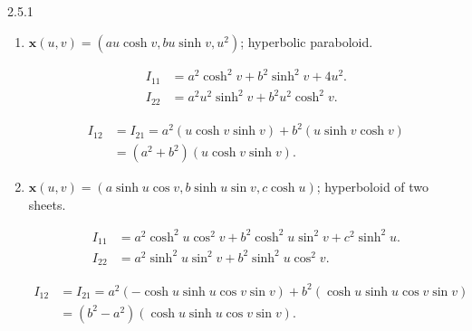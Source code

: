 \documentclass[11pt]{article}
\begin{document}
\begin{problem}{2.5.1}
\begin{enumerate}[label=(\alph*)]
\begin{answer}
			      \begin{equation}
				      \label{eq:11}
				      \begin{aligned}
					      I_{12} & = I_{21} = a^2(-u\cos v\sin v) + b^2(u\sin v \cos v) \\
					             & = (b^2 - a^2)(u \cos v \sin v).
				      \end{aligned}
			      \end{equation}
		      \end{answer}
		\item \( \mathbf{x}(u,v) = (au \cosh v, bu \sinh v, u^2) \); hyperbolic paraboloid.
		      \begin{answer}
			      \begin{equation}
				      \label{eq:12}
				      \begin{aligned}
					      I_{11} & = a^2 \cosh^2 v + b^2 \sinh^2 v + 4 u^2. \\
					      I_{22} & = a^2 u^2\sinh^2 v + b^2 u^2 \cosh^2 v.
				      \end{aligned}
			      \end{equation}

            \begin{equation}
            \label{eq:13}
            \begin{aligned}
              I_{12} &= I_{21} = a^2(u \cosh v \sinh v) + b^2(u \sinh v \cosh v) \\
              &= (a^2 + b^2)(u \cosh v \sinh v).
            \end{aligned}
            \end{equation}
		      \end{answer}
		\item \( \mathbf{x}(u,v) = (a \sinh u \cos v, b \sinh u \sin v, c \cosh u) \); hyperboloid of two sheets.
          \begin{answer}
            \begin{equation}
            \label{eq:15}
            \begin{aligned}
              I_{11} &= a^2 \cosh^2u \cos^2 v + b^2 \cosh^2 u \sin^2 v + c^2 \sinh^2 u. \\
              I_{22} &= a^2 \sinh^2 u \sin^2 v + b^2 \sinh^2 u \cos^2 v.
            \end{aligned}
            \end{equation}

            \begin{equation}
            \label{eq:16}
            \begin{aligned}
              I_{12} &= I_{21} = a^2(-\cosh u \sinh u \cos v \sin v) + b^2(\cosh u \sinh u \cos v \sin v) \\
              &= (b^2 - a^2)(\cosh u \sinh u \cos v \sin v).
            \end{aligned}
            \end{equation}
          \end{answer}
	\end{enumerate}
\end{problem}
\end{document}
